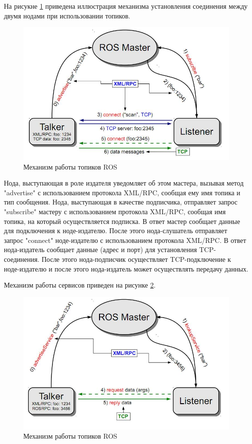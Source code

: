 На рисукне \ref{img:ros_topic_mechainism} приведена иллюстрация механизма установления соединения между двумя нодами
при использовании топиков.

\begin{figure}[h]
    \centering
    \includegraphics[width=0.8\linewidth]{images/3_devel/ros_topic}
    \caption{Механизм работы топиков ROS}
    \label{img:ros_topic_mechainism}
\end{figure}

Нода, выступающая в роле издателя уведомляет об этом мастера, вызывая метод "advertise" с использованием протокола XML/RPC,
сообщая ему имя топика и тип сообщения. Нода, выступающая в качестве подписчика, отправляет запрос "subscribe" мастеру
с использованием протокола XML/RPC, сообщая имя топика, на который осуществляется подписка. В ответ мастер сообщает
данные для подключения к ноде-издателю. После этого нода-слушатель отправляет запрос "connect" ноде-издателю с
использованием протокола XML/RPC. В ответ нода-издатель сообщает данные (адрес и порт) для установления TCP-соединения.
После этого нода-подписчик осуществляет TCP-подключение к ноде-издателю и после этого нода-издатель может осуществлять
передачу данных.

Механизм работы сервисов приведен на рисунке \ref{img:ros_service_mechainism}.

\begin{figure}[h]
    \centering
    \includegraphics[width=0.8\linewidth]{images/3_devel/ros_service}
    \caption{Механизм работы топиков ROS}
    \label{img:ros_service_mechainism}
\end{figure}

